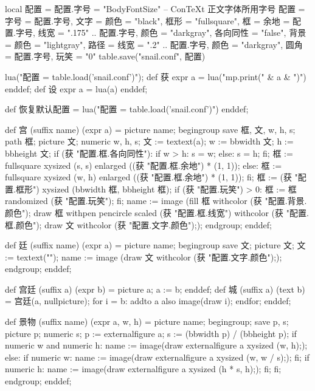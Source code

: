 \startluacode
local 配置 = {}
配置.字号 = "BodyFontSize" -- ConTeXt 正文字体所用字号
配置 = {
    字号 = 配置.字号,
    文字 = {颜色 = "black"},
    框形 = "fullsquare",
    框 = {余地 = 配置.字号, 线宽 = ".175" .. 配置.字号, 颜色 = "darkgray", 各向同性 = "false"},
    背景 = {颜色 = "lightgray"},
    路径 = {线宽 = ".2" .. 配置.字号, 颜色 = "darkgray", 圆角 = 配置.字号},
    玩笑 = "0"
}
table.save("snail.conf", 配置)
\stopluacode

\startMPinclusions
lua("配置 = table.load('snail.conf')");
def 获 expr a = lua("mp.print(" & a & ")") enddef;
def 设 expr a = lua(a) enddef;

def 恢复默认配置 =
  lua("配置 = table.load('snail.conf')")
enddef;
\stopMPinclusions

\startMPinclusions[+]
def 宫 (suffix name) (expr a) =
  picture name;
  begingroup
    save 框, 文, w, h, s;
    path 框; picture 文; numeric w, h, s;
    文 := textext(a);
    w := bbwidth 文; h := bbheight 文;
    if (获 "配置.框.各向同性"):
      if w > h: s = w; else: s = h; fi;
      框 := fullsquare xysized (s, s) enlarged ((获 "配置.框.余地") * (1, 1));
    else:
      框 := fullsquare xysized (w, h) enlarged ((获 "配置.框.余地") * (1, 1));
    fi;
    框 := (获 "配置.框形") xysized (bbwidth 框, bbheight 框);
    if (获 "配置.玩笑") > 0: 框 := 框 randomized (获 "配置.玩笑"); fi;
    name := image (fill 框 withcolor (获 "配置.背景.颜色");
                   draw 框 withpen pencircle scaled (获 "配置.框.线宽")
                           withcolor (获 "配置.框.颜色");
                   draw 文 withcolor (获 "配置.文字.颜色"););
  endgroup;
enddef;
\stopMPinclusions

\startMPinclusions[+]
  def 廷 (suffix name) (expr a) =
    picture name;
    begingroup
    save 文; picture 文; 文 := textext("");
    name := image (draw 文 withcolor (获 "配置.文字.颜色"););
    endgroup;
enddef;
\stopMPinclusions

\startMPinclusions[+]
def 宫廷 (suffix a) (expr b) = picture a; a := b; enddef;
def 城 (suffix a) (text b) =
  宫廷(a, nullpicture);
  for i = b: addto a also image(draw i); endfor;
enddef;
\stopMPinclusions

\startMPinclusions[+]
def 景物 (suffix name) (expr a, w, h) =
  picture name;
  begingroup;
  save p, s; picture p; numeric s;
  p := externalfigure a;
  s := (bbwidth p) / (bbheight p);
  if numeric w and numeric h:
    name := image(draw externalfigure a xysized (w, h););
  else:
    if numeric w:
      name := image(draw externalfigure a xysized (w, w / s););
    fi;
    if numeric h:
       name := image(draw externalfigure a xysized (h * s, h););
    fi;
  fi;
  endgroup;
enddef;
\stopMPinclusions
  
